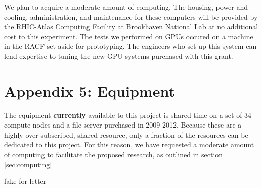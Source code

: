 \documentclass[12pt]{article}
\begin{document}
We plan to acquire a moderate amount of computing.  The housing, power and
cooling, administration, and maintenance for these computers will be provided
by the RHIC-Atlas Computing Facility at Brookhaven National Lab at no
additional cost to this experiment.	The tests we performed on GPUs occured on a
machine in the RACF set aside for prototyping.  The engineers who set up this
system can lend expertise to tuning the new GPU systems purchased with this
grant.

\newpage
{}
\section*{Appendix 5: Equipment}

The equipment {\bf currently} available to this project is shared time on a set
of 34 compute nodes and a file server purchased in 2009-2012.  
Because these are a highly over-subscribed, shared resource, only a fraction of
the resources can be dedicated to this project.  For this reason, we have requested
a moderate amount of computing to facilitate the proposed research, as outlined
in section \ref{sec:computing}

\newpage
{}
fake for letter
\end{document}
